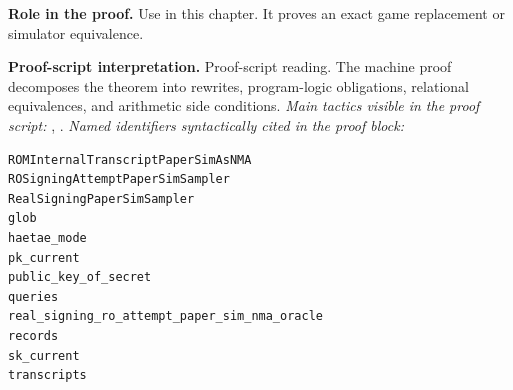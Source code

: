 \begin{formaltheorem}
\noindent\textbf{Role in the proof.}
Use in this chapter. It proves an exact game replacement or simulator equivalence.

\noindent\textbf{Proof-script interpretation.}
Proof-script reading. The machine proof decomposes the theorem into rewrites, program-logic obligations, relational equivalences, and arithmetic side conditions.
\emph{Main tactics visible in the proof script:} , .
\emph{Named identifiers syntactically cited in the proof block:}
\begin{lstlisting}[language=EasyCrypt,basicstyle=\ttfamily\scriptsize]
ROMInternalTranscriptPaperSimAsNMA
ROSigningAttemptPaperSimSampler
RealSigningPaperSimSampler
glob
haetae_mode
pk_current
public_key_of_secret
queries
real_signing_ro_attempt_paper_sim_nma_oracle
records
sk_current
transcripts
\end{lstlisting}

\end{formaltheorem}

